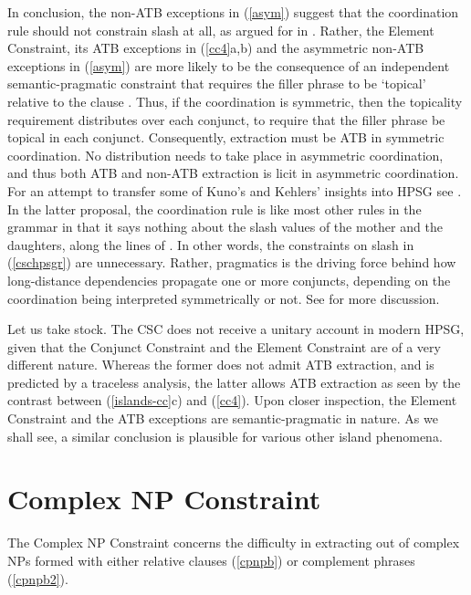 \documentclass[output=paper
                ,modfonts
                ,nonflat
	        ,collection
	        ,collectionchapter
	        ,collectiontoclongg
 	        ,biblatex
                ,babelshorthands
                ,newtxmath
                ,draftmode
                ,colorlinks, citecolor=brown
]{./langsci/langscibook}
\begin{document}
In conclusion, the  non-ATB exceptions in (\ref{asym}) suggest that the coordination rule should not constrain {\sc slash} at all, as argued for in \citet{chaves}.  Rather,  the Element Constraint, its ATB exceptions in (\ref{cc4}a,b) and the asymmetric non-ATB exceptions in (\ref{asym}) are more likely to be the consequence of an independent semantic-pragmatic constraint that requires the filler phrase to be `topical'  relative to the clause \citep{lakoff86,kuno87,kehler,kubotalee}. Thus, if the coordination is  symmetric, then the topicality requirement  distributes over each conjunct, to require that the  filler phrase be topical in each conjunct. Consequently, extraction must
be ATB in symmetric coordination. No distribution needs to take place in asymmetric coordination, and thus both 
ATB and non-ATB extraction is licit in asymmetric coordination. For an attempt to transfer
some of Kuno's and Kehlers' insights into HPSG  see \citet{chaves}. In the latter proposal,
 the coordination rule is like most other rules in the grammar in that it says nothing about
the {\sc slash} values of the mother and the daughters, along the lines of 
\citet[354]{levhubook}. In other words, the constraints on {\sc slash} in (\ref{cschpsgr}) are unnecessary.  Rather, pragmatics is the driving force behind how  long-distance dependencies propagate one or more conjuncts, depending on the coordination being interpreted symmetrically or not. 
See  for more discussion.

Let us take stock. The CSC does not receive a unitary account in modern HPSG, given that the Conjunct Constraint and the Element Constraint  are of a very different nature. Whereas the former does not admit ATB extraction, and is predicted by a traceless analysis, the latter allows ATB extraction as seen by the contrast between  (\ref{islands-cc}c) and  (\ref{cc4}). 
Upon closer inspection, the Element Constraint and the ATB exceptions are semantic-pragmatic in nature.  As we shall see, a similar conclusion is plausible for various other island phenomena.


\section{Complex NP Constraint}

The Complex NP Constraint concerns the difficulty in extracting out of complex NPs formed with either relative clauses (\ref{cpnpb}) or complement phrases (\ref{cpnpb2}).

\eal \label{cpnpb}
\zl
\end{document}
